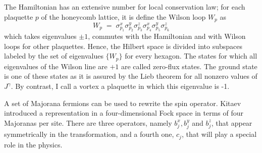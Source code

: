 The Hamiltonian has an extensive number for local conservation law; for each plaquette $p$ of the honeycomb lattice, it is define the Wilson loop $W_p$ as
  \begin{equation}
W_{p} \; = \;  \sigma_{p_1}^{x}\sigma_{p_2}^{y}\sigma_{p_3}^{z}\sigma_{p_4}^{x}\sigma_{p_5}^{y}\sigma_{p_6}^{z} \label{eq:2-WL1}
\end{equation}
which takes eigenvalues $\pm 1$, commutes with the Hamiltonian and with Wilson loops for other plaquettes. Hence, the Hilbert space is divided into subspaces labeled by the set of eigenvalues $\{ W_p \}$ for every hexagon. The states for which all eigenvalues of the Wilson line are $+1$ are called zero-flux states. The ground state is one of these states as it is assured by the Lieb theorem \cite{Lieb_1994} for all nonzero values of $J^{\gamma}$.  By contrast, I call a vortex a plaquette in which this eigenvalue is -1. %

A set of Majorana fermions can be used to rewrite the spin operator. %
Kitaev introduced a representation in a four-dimensional Fock space in terms of four Majoranas per site. There are three operators, namely $b^{x}_{j}, b^{y}_{j}$ and $ b^{z}_{j}$, that appear symmetrically in the transformation, and a fourth one, $c_j$, that will play a special role in the physics.%


